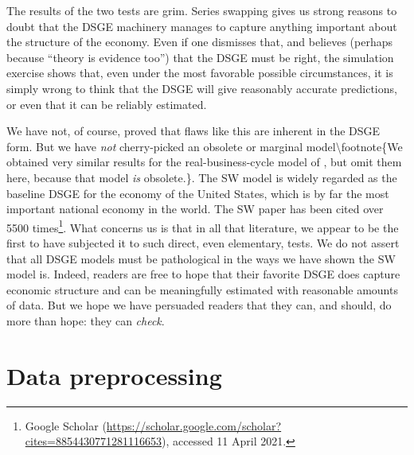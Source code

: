 \documentclass[11pt]{article}
\begin{document}
The results of the two tests are grim. Series swapping gives us strong
reasons to doubt that the DSGE machinery manages to capture anything
important about the structure of the economy. Even if one dismisses
that, and believes (perhaps because ``theory is evidence too'') that the
DSGE must be right, the simulation exercise shows that, even under the
most favorable possible circumstances, it is simply wrong to think that
the DSGE will give reasonably accurate predictions, or even that it can
be reliably estimated.

We have not, of course, proved that flaws like this are inherent in the
DSGE form. But we have \emph{not} cherry-picked an obsolete or marginal
model\textbackslash footnote\{We obtained very similar results for the
real-business-cycle model of \citet{KydlandPrescott1982}, but omit them
here, because that model \emph{is} obsolete.\}. The SW model is widely
regarded as the baseline DSGE for the economy of the United States,
which is by far the most important national economy in the world. The SW
paper has been cited over 5500 times\footnote{Google Scholar
(\url{https://scholar.google.com/scholar?cites=8854430771281116653}), accessed
11 April 2021.}. What concerns us is that in all that literature, we
appear to be the first to have subjected it to such direct, even
elementary, tests. We do not assert that all DSGE models must be
pathological in the ways we have shown the SW model is. Indeed, readers
are free to hope that their favorite DSGE does capture economic
structure and can be meaningfully estimated with reasonable amounts of
data. But we hope we have persuaded readers that they can, and should,
do more than hope: they can \emph{check}.

\clearpage

\appendix

\hypertarget{sec:data-preprocessing}{%
\section{Data preprocessing}\label{sec:data-preprocessing}}

\footnotesize
\end{document}
